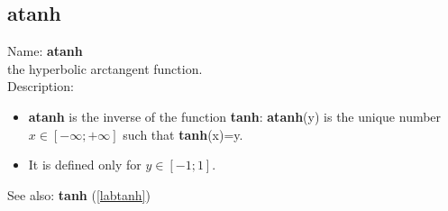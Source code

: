 \subsection{atanh}
\label{labatanh}
\noindent Name: \textbf{atanh}\\
the hyperbolic arctangent function.\\

\noindent Description: \begin{itemize}

\item \textbf{atanh} is the inverse of the function \textbf{tanh}: \textbf{atanh}(y) is the unique number 
   $x \in [-\infty; +\infty]$ such that \textbf{tanh}(x)=y.

\item It is defined only for $y \in [-1; 1]$.
\end{itemize}
See also: \textbf{tanh} (\ref{labtanh})
